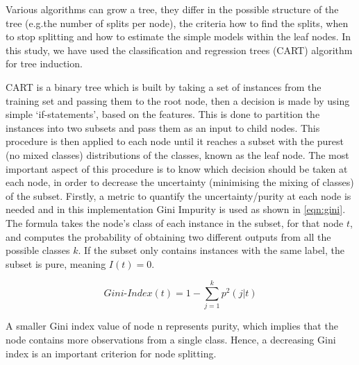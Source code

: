 
Various algorithms can grow a tree, they differ in the possible structure of the tree (e.g.the  number of splits per node), the criteria how to find the splits, when to stop splitting and how to estimate the simple models within the leaf nodes. In this study, we have used the classification and regression trees (CART) algorithm for tree induction.

CART is a binary tree which is built by taking a set of instances from the training set and passing them to the root node, then a decision is made by using simple `if-statements', based on the features. This is done to partition the instances into two subsets and pass them as an input to child nodes. This procedure is then applied to each node until it reaches a subset with the purest (no mixed classes) distributions of the classes, known as the leaf node. 
The most important aspect of this procedure is to know which decision should be taken at each node, in order to decrease the uncertainty (minimising the mixing of classes) of the subset. Firstly, a metric to quantify the uncertainty/purity at each node is needed and in this implementation Gini Impurity \cite{breiman2017classification} is used as shown in \autoref{eqn:gini}. The formula takes the node’s class of each instance in the subset, for that node $t$, and computes the probability of obtaining two different outputs from all the possible classes $k$. If the subset only contains instances with the same label, the subset is pure, meaning $I(t) = 0$. 

\begin{equation}
\label{eqn:gini}
Gini\mbox{-}Index(t)=1-\sum_{j=1}^{k} p^{2}(j | t)
\end{equation}

A smaller Gini index value of node n represents purity, which implies that the node contains more observations from a single class. Hence, a decreasing Gini index is an important criterion for node splitting.

